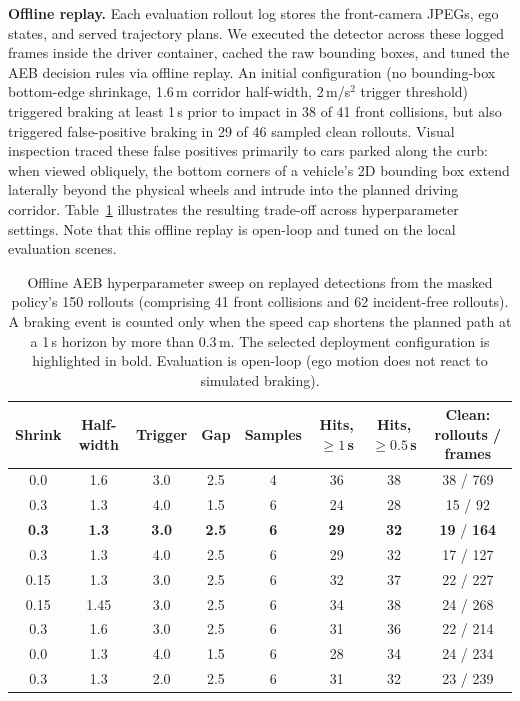 \textbf{Offline replay.} Each evaluation rollout log stores the front-camera JPEGs, ego states, and served trajectory plans. We executed the detector across these logged frames inside the driver container, cached the raw bounding boxes, and tuned the AEB decision rules via offline replay. An initial configuration (no bounding-box bottom-edge shrinkage, 1.6\,m corridor half-width, 2\,m/s$^2$ trigger threshold) triggered braking at least 1\,s prior to impact in 38 of 41 front collisions, but also triggered false-positive braking in 29 of 46 sampled clean rollouts. Visual inspection traced these false positives primarily to cars parked along the curb: when viewed obliquely, the bottom corners of a vehicle's 2D bounding box extend laterally beyond the physical wheels and intrude into the planned driving corridor. Table~\ref{tab:app_sweep} illustrates the resulting trade-off across hyperparameter settings. Note that this offline replay is open-loop and tuned on the local evaluation scenes.

\begin{table}[!htb]
\centering\scriptsize
\caption{Offline AEB hyperparameter sweep on replayed detections from the masked policy's 150 rollouts (comprising 41 front collisions and 62 incident-free rollouts). A braking event is counted only when the speed cap shortens the planned path at a 1\,s horizon by more than 0.3\,m. The selected deployment configuration is highlighted in bold. Evaluation is open-loop (ego motion does not react to simulated braking).}
\label{tab:app_sweep}
\begin{tabular}{cccccccc}
\toprule
Shrink & Half-width & Trigger & Gap & Samples & Hits, $\ge1$\,s & Hits, $\ge0.5$\,s & Clean: rollouts / frames \\
\midrule
0.0 & 1.6 & 3.0 & 2.5 & 4 & 36 & 38 & 38 / 769 \\
0.3 & 1.3 & 4.0 & 1.5 & 6 & 24 & 28 & 15 / 92 \\
\textbf{0.3} & \textbf{1.3} & \textbf{3.0} & \textbf{2.5} & \textbf{6} & \textbf{29} & \textbf{32} & \textbf{19} / \textbf{164} \\
0.3 & 1.3 & 4.0 & 2.5 & 6 & 29 & 32 & 17 / 127 \\
0.15 & 1.3 & 3.0 & 2.5 & 6 & 32 & 37 & 22 / 227 \\
0.15 & 1.45 & 3.0 & 2.5 & 6 & 34 & 38 & 24 / 268 \\
0.3 & 1.6 & 3.0 & 2.5 & 6 & 31 & 36 & 22 / 214 \\
0.0 & 1.3 & 4.0 & 1.5 & 6 & 28 & 34 & 24 / 234 \\
0.3 & 1.3 & 2.0 & 2.5 & 6 & 31 & 32 & 23 / 239 \\
\bottomrule
\end{tabular}
\end{table}

